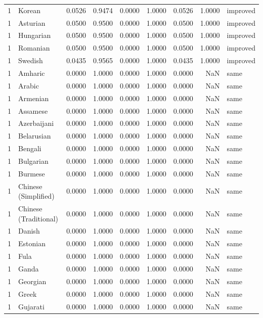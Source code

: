 \begin{tabular}{rlrrrrrrl}
1 & Korean & 0.0526 & 0.9474 & 0.0000 & 1.0000 & 0.0526 & 1.0000 & improved \\
1 & Asturian & 0.0500 & 0.9500 & 0.0000 & 1.0000 & 0.0500 & 1.0000 & improved \\
1 & Hungarian & 0.0500 & 0.9500 & 0.0000 & 1.0000 & 0.0500 & 1.0000 & improved \\
1 & Romanian & 0.0500 & 0.9500 & 0.0000 & 1.0000 & 0.0500 & 1.0000 & improved \\
1 & Swedish & 0.0435 & 0.9565 & 0.0000 & 1.0000 & 0.0435 & 1.0000 & improved \\
1 & Amharic & 0.0000 & 1.0000 & 0.0000 & 1.0000 & 0.0000 & NaN & same \\
1 & Arabic & 0.0000 & 1.0000 & 0.0000 & 1.0000 & 0.0000 & NaN & same \\
1 & Armenian & 0.0000 & 1.0000 & 0.0000 & 1.0000 & 0.0000 & NaN & same \\
1 & Assamese & 0.0000 & 1.0000 & 0.0000 & 1.0000 & 0.0000 & NaN & same \\
1 & Azerbaijani & 0.0000 & 1.0000 & 0.0000 & 1.0000 & 0.0000 & NaN & same \\
1 & Belarusian & 0.0000 & 1.0000 & 0.0000 & 1.0000 & 0.0000 & NaN & same \\
1 & Bengali & 0.0000 & 1.0000 & 0.0000 & 1.0000 & 0.0000 & NaN & same \\
1 & Bulgarian & 0.0000 & 1.0000 & 0.0000 & 1.0000 & 0.0000 & NaN & same \\
1 & Burmese & 0.0000 & 1.0000 & 0.0000 & 1.0000 & 0.0000 & NaN & same \\
1 & Chinese (Simplified) & 0.0000 & 1.0000 & 0.0000 & 1.0000 & 0.0000 & NaN & same \\
1 & Chinese (Traditional) & 0.0000 & 1.0000 & 0.0000 & 1.0000 & 0.0000 & NaN & same \\
1 & Danish & 0.0000 & 1.0000 & 0.0000 & 1.0000 & 0.0000 & NaN & same \\
1 & Estonian & 0.0000 & 1.0000 & 0.0000 & 1.0000 & 0.0000 & NaN & same \\
1 & Fula & 0.0000 & 1.0000 & 0.0000 & 1.0000 & 0.0000 & NaN & same \\
1 & Ganda & 0.0000 & 1.0000 & 0.0000 & 1.0000 & 0.0000 & NaN & same \\
1 & Georgian & 0.0000 & 1.0000 & 0.0000 & 1.0000 & 0.0000 & NaN & same \\
1 & Greek & 0.0000 & 1.0000 & 0.0000 & 1.0000 & 0.0000 & NaN & same \\
1 & Gujarati & 0.0000 & 1.0000 & 0.0000 & 1.0000 & 0.0000 & NaN & same \\

\end{tabular}
